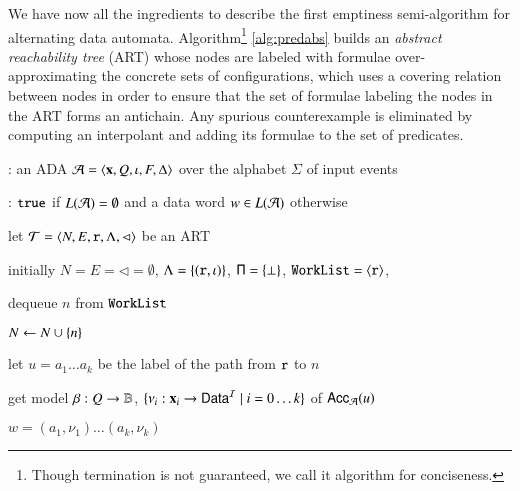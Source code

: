 \documentclass[10pt,conference,letterpaper,twocolumn]{IEEEtran}
\begin{document}
We have now all the ingredients to describe the first emptiness
semi-algorithm for alternating data
automata. Algorithm\footnote{Though termination is not guaranteed, we
  call it algorithm for conciseness.} \ref{alg:predabs} builds an
\emph{abstract reachability tree} (ART) whose nodes are labeled with
formulae over-approximating the concrete sets of configurations, which
uses a covering relation between nodes in order to ensure that the set
of formulae labeling the nodes in the ART forms an antichain. Any
spurious counterexample is eliminated by computing an interpolant and
adding its formulae to the set of predicates.

\begin{algorithm}[t!]
{\scriptsize\begin{algorithmic}[0]
: an ADA $\mathcal{A} = \left\langle \mathbf x,Q,\iota,F,\Delta \right\rangle$
over the alphabet $\Sigma$ of input events

: $\mathtt{true}$ if $L(\mathcal{A})=\emptyset$ and a data word $w
\in L(\mathcal{A})$ otherwise
\end{algorithmic}}

{\scriptsize\begin{algorithmic}[1] 

  \State let $\mathcal{T} = \left\langle N,E,\mathtt{r},\Lambda,\lhd \right\rangle$ be an ART

  \State initially $N = E = \lhd = \emptyset$, $\Lambda =
  \left\{ (\mathtt{r},\iota) \right\}$, $\mathsf{\Pi} = \left\{ \bot \right\}$, $\mathtt{WorkList} =
  \left\langle \mathtt{r} \right\rangle$,

  \While {$\worklist \neq \emptyset$}
  \label{ln:while}
  
  \State dequeue $n$ from $\mathtt{WorkList}$ 

  \State $N \leftarrow N \cup \left\{ n \right\}$

   

  \State let $u = a_1\ldots a_k$ be the label of the path from
  $\mathtt{r}$ to $n$ 

   
  \label{ln:feasible}

  \State get model $\beta : Q \rightarrow \mathbb{B}$, $\{\nu_i :
  \mathbf x_i \rightarrow \mathsf{Data}^{\mathcal{I}} \mid i=0\ldots k\}$ of $\mathsf{Acc}_{\mathcal{A}}(u)$

   $w = (a_1,\nu_1) \ldots (a_k,\nu_k)$
  \label{ln:cex}

  \Else {}


\end{algorithmic}}
\end{algorithm}
\end{document}
